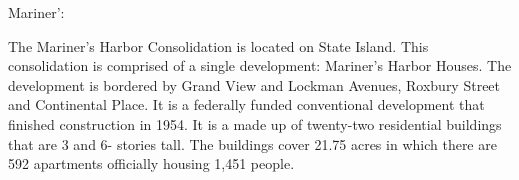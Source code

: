 Mariner':        \par \vspace{.7\baselineskip}      \par \vspace{.7\baselineskip}The Mariner's Harbor Consolidation is located on State Island. This consolidation is comprised of a single development: Mariner's Harbor Houses. The development is bordered by Grand View and Lockman Avenues, Roxbury Street and Continental Place. It is a federally funded conventional development that finished construction in 1954. It is a made up of twenty-two residential buildings that are 3 and 6- stories tall. The buildings cover 21.75 acres in which there are 592 apartments officially housing 1,451 people.